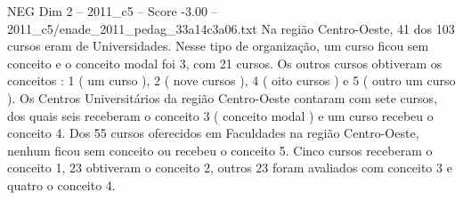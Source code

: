 \begin{textsample}{NEG Dim 2 – 2011\_c5 – Score -3.00 – 2011\_c5/enade\_2011\_pedag\_33a14c3a06.txt}
Na região Centro-Oeste, 41 dos 103 cursos eram de Universidades.
Nesse tipo de organização, um curso ficou sem conceito e o conceito modal foi 3, com 21 cursos.
Os outros cursos obtiveram os conceitos : 1 ( um curso ), 2 ( nove cursos ), 4 ( oito cursos ) e 5 ( outro um curso ).
Os Centros Universitários da região Centro-Oeste contaram com sete cursos, dos quais seis receberam o conceito 3 ( conceito modal ) e um curso recebeu o conceito 4.
Dos 55 cursos oferecidos em Faculdades na região Centro-Oeste, nenhum ficou sem conceito ou recebeu o conceito 5.
Cinco cursos receberam o conceito 1, 23 obtiveram o conceito 2, outros 23 foram avaliados com conceito 3 e quatro o conceito 4.

\end{textsample}
